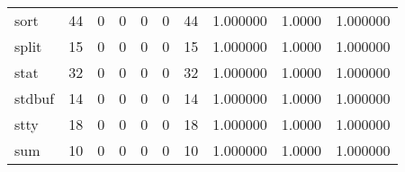\begin{tabular}{lrrrrrrrrr}
sort      &                                       44 &                                                  0 &                                                  0 &                                                  0 &                                                  0 &                                                 44 &                                           1.000000 &                                 1.0000 &                             1.000000 \\
split     &                                       15 &                                                  0 &                                                  0 &                                                  0 &                                                  0 &                                                 15 &                                           1.000000 &                                 1.0000 &                             1.000000 \\
stat      &                                       32 &                                                  0 &                                                  0 &                                                  0 &                                                  0 &                                                 32 &                                           1.000000 &                                 1.0000 &                             1.000000 \\
stdbuf    &                                       14 &                                                  0 &                                                  0 &                                                  0 &                                                  0 &                                                 14 &                                           1.000000 &                                 1.0000 &                             1.000000 \\
stty      &                                       18 &                                                  0 &                                                  0 &                                                  0 &                                                  0 &                                                 18 &                                           1.000000 &                                 1.0000 &                             1.000000 \\
sum       &                                       10 &                                                  0 &                                                  0 &                                                  0 &                                                  0 &                                                 10 &                                           1.000000 &                                 1.0000 &                             1.000000 \\

\end{tabular}
